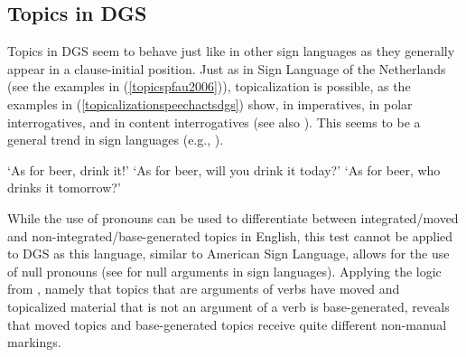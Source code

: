 \subsection{Topics in DGS}\label{topicsindgssection}

Topics in DGS seem to behave just like in other sign languages as they generally appear in a clause-initial position. Just as in Sign Language of the Netherlands (see the examples in (\ref{topicspfau2006})), topicalization is possible, as the examples in (\ref{topicalizationspeechactsdgs}) show, in imperatives, in polar interrogatives, and in content interrogatives  (see also \citealt[391]{happ2014vork}). This seems to be a general trend in sign languages (e.g., \citealt[24]{zeshan2004interrogative}).  

\begin{exe}
\ex\label{topicalizationspeechactsdgs}\begin{xlist} 
\ex {} 
\glt `As for beer, drink it!' \label{topicalizationspeechactsdgsa}
\ex {} 
%
\glt `As for beer, will you drink it today?' \label{topicalizationspeechactsdgsb}
\ex {} 
\glt `As for beer, who drinks it tomorrow?' \label{topicalizationspeechactsdgsc}
\end{xlist}
\end{exe}

\noindent While the use of pronouns can be used to differentiate between integrated/moved and non-integrated/base-generated topics in English, this test cannot be applied to DGS as this language, similar to American Sign Language, allows for the use of null pronouns (see \citealt{lillo1986two} for null arguments in sign languages). Applying the logic from \citet{aarons1994aspects}, namely that topics that are arguments of verbs have moved and topicalized material that is not an argument of a verb is base-generated, reveals that moved topics and base-generated topics receive quite different non-manual markings.

